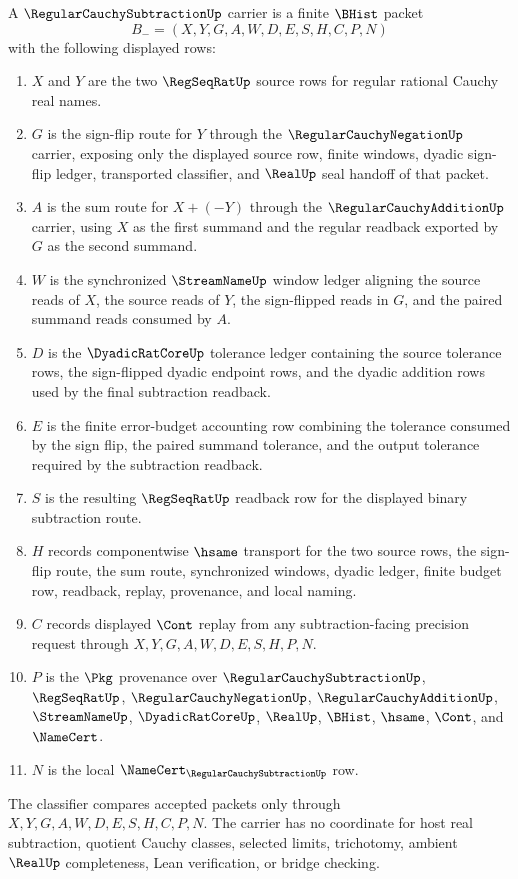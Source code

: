 \begin{definition}
\label{def:regular-cauchy-subtraction-carrier}
A $\RegularCauchySubtractionUp$ carrier is a finite $\BHist$ packet
$$
B_-=(X,Y,G,A,W,D,E,S,H,C,P,N)
$$
with the following displayed rows:
\begin{enumerate}
\item $X$ and $Y$ are the two $\RegSeqRatUp$ source rows for regular rational Cauchy real names.
\item $G$ is the sign-flip route for $Y$ through the $\RegularCauchyNegationUp$ carrier, exposing only the displayed source row, finite windows, dyadic sign-flip ledger, transported classifier, and $\RealUp$ seal handoff of that packet.
\item $A$ is the sum route for $X+(-Y)$ through the $\RegularCauchyAdditionUp$ carrier, using $X$ as the first summand and the regular readback exported by $G$ as the second summand.
\item $W$ is the synchronized $\StreamNameUp$ window ledger aligning the source reads of $X$, the source reads of $Y$, the sign-flipped reads in $G$, and the paired summand reads consumed by $A$.
\item $D$ is the $\DyadicRatCoreUp$ tolerance ledger containing the source tolerance rows, the sign-flipped dyadic endpoint rows, and the dyadic addition rows used by the final subtraction readback.
\item $E$ is the finite error-budget accounting row combining the tolerance consumed by the sign flip, the paired summand tolerance, and the output tolerance required by the subtraction readback.
\item $S$ is the resulting $\RegSeqRatUp$ readback row for the displayed binary subtraction route.
\item $H$ records componentwise $\hsame$ transport for the two source rows, the sign-flip route, the sum route, synchronized windows, dyadic ledger, finite budget row, readback, replay, provenance, and local naming.
\item $C$ records displayed $\Cont$ replay from any subtraction-facing precision request through $X,Y,G,A,W,D,E,S,H,P,N$.
\item $P$ is the $\Pkg$ provenance over $\RegularCauchySubtractionUp$, $\RegSeqRatUp$, $\RegularCauchyNegationUp$, $\RegularCauchyAdditionUp$, $\StreamNameUp$, $\DyadicRatCoreUp$, $\RealUp$, $\BHist$, $\hsame$, $\Cont$, and $\NameCert$.
\item $N$ is the local $\NameCert_{\RegularCauchySubtractionUp}$ row.
\end{enumerate}
The classifier compares accepted packets only through $X,Y,G,A,W,D,E,S,H,C,P,N$. The carrier has no coordinate for host real subtraction, quotient Cauchy classes, selected limits, trichotomy, ambient $\RealUp$ completeness, Lean verification, or bridge checking.
\end{definition}

